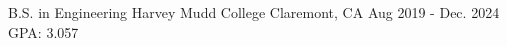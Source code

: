 

\begin{cventries}

  \cventry
    {B.S. in Engineering} %
    {Harvey Mudd College} %
    {Claremont, CA} %
    {Aug 2019 - Dec. 2024} %
    {GPA: 3.057}

\end{cventries}
